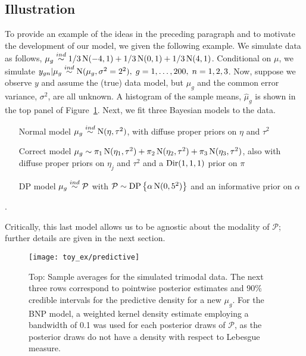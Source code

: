 \subsection{Illustration}
\label{subsec:illustration}
To provide an example of the ideas in the preceding paragraph and to motivate the development of our model, we given the following example. 
We simulate data as follows, $\mu_g \stackrel{ind}{\sim} 1/3\operatorname{N}(-4,1)+1/3\operatorname{N}(0,1)+1/3\operatorname{N}(4,1)$. Conditional on $\mu$, we simulate $y_{gn}|\mu_g \stackrel{ind}{\sim} \operatorname{N}(\mu_g,\sigma^2=2^2),\; g=1,\ldots,200,\;n=1,2,3$. Now, suppose we observe $y$ and assume the (true) data model, but $\mu_g$ and the common error variance, $\sigma^2$, are all unknown. A histogram of the sample means, $\hat{\mu}_g$ is shown in the top panel of Figure~\ref{predictive}. Next, we fit three Bayesian models to the data.
\begin{enumerate}
\item[Normal model] $\mu_g \stackrel{ind}{\sim} \operatorname{N}(\eta, \tau^2)$, with diffuse proper priors on $\eta$ and $\tau^2$
\item[Correct model] $\mu_g \sim \pi_1\operatorname{N}(\eta_1,\tau^2)+\pi_2\operatorname{N}(\eta_2,\tau^2)+\pi_3\operatorname{N}(\eta_3,\tau^2)$, also with diffuse proper priors on $\eta_j$ and $\tau^2$ and a $\operatorname{Dir}(1,1,1)$ prior on $\pi$
\item[DP model]$\mu_g \stackrel{ind}{\sim} \mathcal{P}$ with $\mathcal{P} \sim \operatorname{DP}\left\{\alpha \operatorname{N}(0,5^2)\right\}$ and an informative prior on $\alpha$
\end{enumerate}. 

Critically, this last model allows us to be agnostic about the modality of $\mathcal{P}$; further details are given in the next section.

\begin{figure}[ht]
\centering
\texttt{[image: toy\_ex/predictive]}
\begin{minipage}{.8\textwidth}
\caption{\small Top: Sample averages for the simulated trimodal data. The next three rows correspond to pointwise posterior estimates and 90\% credible intervals for the predictive density for a new $\mu_g$. For the BNP model, a weighted kernel density estimate employing a bandwidth of 0.1  was used for each posterior draws of $\mathcal{P}$, as the posterior draws do not have a density with respect to Lebesgue measure.}
\label{predictive}
\end{minipage}
\end{figure}


